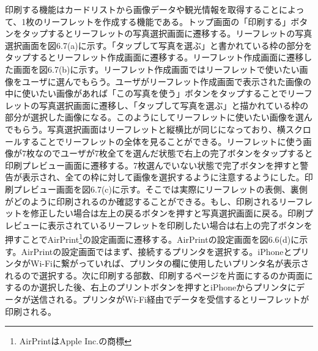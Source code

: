 印刷する機能はカードリストから画像データや観光情報を取得することによって、1枚のリーフレットを作成する機能である。トップ画面の「印刷する」ボタンをタップするとリーフレットの写真選択画面に遷移する。リーフレットの写真選択画面を図6.7(a)に示す。「タップして写真を選ぶ」と書かれている枠の部分をタップするとリーフレット作成画面に遷移する。リーフレット作成画面に遷移した画面を図6.7(b)に示す。リーフレット作成画面ではリーフレットで使いたい画像をユーザに選んでもらう。ユーザがリーフレット作成画面で表示された画像の中に使いたい画像があれば「この写真を使う」ボタンをタップすることでリーフレットの写真選択画面に遷移し、「タップして写真を選ぶ」と描かれている枠の部分が選択した画像になる。このようにしてリーフレットに使いたい画像を選んでもらう。写真選択画面はリーフレットと縦横比が同じになっており、横スクロールすることでリーフレットの全体を見ることができる。リーフレットに使う画像が7枚なのでユーザが7枚全てを選んだ状態で右上の完了ボタンをタップすると印刷プレビュー画面に遷移する。7枚選んでいない状態で完了ボタンを押すと警告が表示され、全ての枠に対して画像を選択するように注意するようにした。印刷プレビュー画面を図6.7(c)に示す。そこでは実際にリーフレットの表側、裏側がどのように印刷されるのか確認することができる。もし、印刷されるリーフレットを修正したい場合は左上の戻るボタンを押すと写真選択画面に戻る。印刷プレビューに表示されているリーフレットを印刷したい場合は右上の完了ボタンを押すことでAirPrint\footnote{AirPrintはApple Inc.の商標}の設定画面に遷移する。AirPrintの設定画面を図6.6(d)に示す。AirPrintの設定画面ではまず、接続するプリンタを選択する。iPhoneとプリンタがWi-Fiに繋がっていれば、プリンタの欄に使用したいプリンタ名が表示されるので選択する。次に印刷する部数、印刷するページを片面にするのか両面にするのか選択した後、右上のプリントボタンを押すとiPhoneからプリンタにデータが送信される。プリンタがWi-Fi経由でデータを受信するとリーフレットが印刷される。
